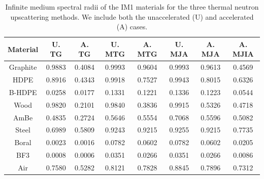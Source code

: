 \begin{table}
\caption{Infinite medium spectral radii of the IM1 materials for the three thermal neutron upscattering methods. We include both the unaccelerated (U) and accelerated (A) cases.}
\centering
\def\arraystretch{1.2}
\begin{tabular}{|c||c|c||c|c||c|c|c|}
\hline
Material  & U. TG & A. TG & U. MTG & A. MTG & U. MJA & A. MJA & A. MJIA \\ \hline
Graphite & 0.9883&0.4084&0.9993&0.9604&0.9993&0.9613&0.4569\\
HDPE &0.8916&0.4343&0.9918&0.7527&0.9943&0.8015&0.6326\\
B-HDPE &0.0258&0.0177&0.1331&0.1221&0.1336&0.1223&0.0544 \\
Wood & 0.9820&0.2101&0.9840&0.3836&0.9915&0.5326&0.4718 \\
AmBe  &0.4835&0.2724&0.5646&0.5554&0.7068&0.5596&0.5082 \\
Steel  & 0.6989&0.5809&0.9243&0.9215&0.9255&0.9215&0.7735\\
Boral  & 0.0023&0.0016&0.0782&0.0602&0.0782&0.0602&0.0205 \\
BF3   & 0.0008&0.0006&0.0351&0.0266&0.0351&0.0266&0.0086 \\
Air     &0.7580&0.5282&0.8121&0.7828&0.8845&0.7896&0.7312\\
\hline
\end{tabular}
\label{tab::IM1_inf_med_SR}
\end{table}


